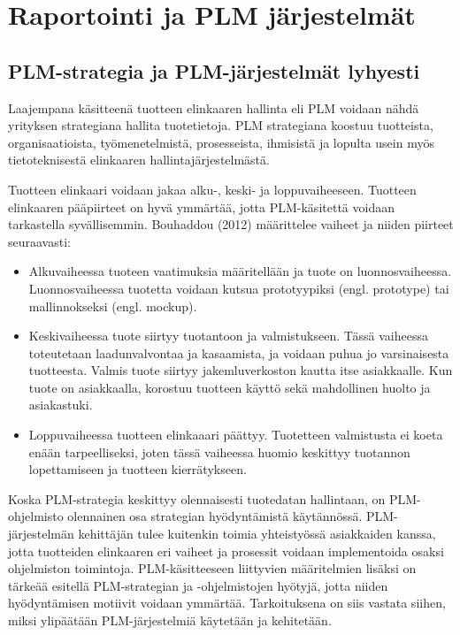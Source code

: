 \chapter{Raportointi ja PLM järjestelmät} \label{Raportointi ja PLM järjestelmät}

\section{PLM-strategia ja PLM-järjestelmät lyhyesti} \label{PLM-järjestelmät}

Laajempana käsitteenä tuotteen elinkaaren hallinta eli PLM voidaan nähdä yrityksen strategiana hallita tuotetietoja. PLM strategiana koostuu tuotteista, organisaatioista, työmenetelmistä, prosesseista, ihmisistä ja lopulta usein myös tietoteknisestä elinkaaren hallintajärjestelmästä.

Tuotteen elinkaari voidaan jakaa alku-, keski- ja loppuvaiheeseen. Tuotteen elinkaaren pääpiirteet on hyvä ymmärtää, jotta PLM-käsitettä voidaan tarkastella syvällisemmin. Bouhaddou (2012) määrittelee vaiheet ja niiden piirteet seuraavasti:

\begin{itemize}
	\item Alkuvaiheessa tuoteen vaatimuksia määritellään ja tuote on luonnosvaiheessa. Luonnosvaiheessa tuotetta voidaan kutsua prototyypiksi (engl. prototype) tai mallinnokseksi (engl. mockup).
	\item Keskivaiheessa tuote siirtyy tuotantoon ja valmistukseen. Tässä vaiheessa toteutetaan laadunvalvontaa ja kasaamista, ja voidaan puhua jo varsinaisesta tuotteesta. Valmis tuote siirtyy jakemluverkoston kautta itse asiakkaalle. Kun tuote on asiakkaalla, korostuu tuotteen käyttö sekä mahdollinen huolto ja asiakastuki.
	\item Loppuvaiheessa tuotteen elinkaaari päättyy. Tuotetteen valmistusta ei koeta enään tarpeelliseksi, joten tässä vaiheessa huomio keskittyy tuotannon lopettamiseen ja tuotteen kierrätykseen.
\end{itemize}
\cite{bouhaddou_plm_2012}

Koska PLM-strategia keskittyy olennaisesti tuotedatan hallintaan, on PLM-ohjelmisto olennainen osa strategian hyödyntämistä käytännössä. PLM-järjestelmän kehittäjän tulee kuitenkin toimia yhteistyössä asiakkaiden kanssa, jotta tuotteiden elinkaaren eri vaiheet ja prosessit voidaan implementoida osaksi ohjelmiston toimintoja. PLM-käsitteeseen liittyvien määritelmien lisäksi on tärkeää esitellä PLM-strategian ja -ohjelmistojen hyötyjä, jotta niiden hyödyntämisen motiivit voidaan ymmärtää. Tarkoituksena on siis vastata siihen, miksi ylipäätään PLM-järjestelmiä käytetään ja kehitetään. \cite{alemanni_key_2008}

